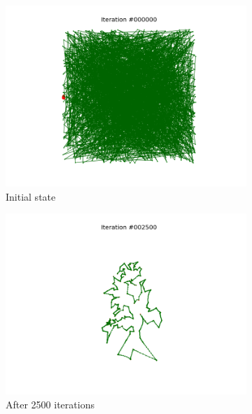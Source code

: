 \documentclass[11pt]{article}
\begin{document}
\begin{figure}
\centering
\begin{subfigure}{.33\textwidth}
  \centering
  \includegraphics[trim={3cm 1.5cm 3cm 1.5cm}, clip=true,
  width=\linewidth]{q_0.png}
  \caption{Initial state}
\end{subfigure}%
\begin{subfigure}{.33\textwidth}
  \centering
  \includegraphics[trim={6cm 2cm 6cm 2cm}, clip=true,width=\linewidth]{q_2500.png}
  \caption{After 2500 iterations}
\end{subfigure}
\begin{subfigure}{.33\textwidth}
  \centering

\end{subfigure}
\end{figure}
\end{document}

